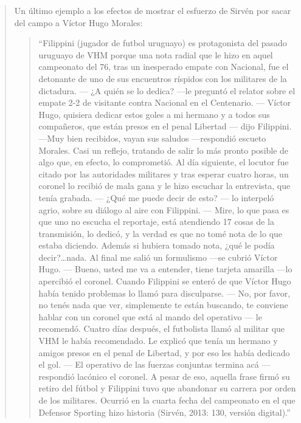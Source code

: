 \begin{quote}
Un último ejemplo a los efectos de mostrar el esfuerzo de Sirvén por sacar del campo a Víctor Hugo Morales:

\begin{quote}
	\enquote{Filippini (jugador de futbol uruguayo) es protagonista del pasado uruguayo de VHM porque una nota radial que le hizo en aquel campeonato del 76, tras un inesperado empate con Nacional, fue el detonante de uno de sus encuentros ríspidos con los militares de la dictadura. --- ¿A quién se lo dedica? ---le preguntó el relator sobre el empate 2-2 de visitante contra Nacional en el Centenario. --- Víctor Hugo, quisiera dedicar estos goles a mi hermano y a todos sus compañeros, que están presos en el penal Libertad --- dijo Filippini. ---Muy bien recibidos, vayan sus saludos ---respondió escueto Morales. Casi un reflejo, tratando de salir lo más pronto posible de algo que, en efecto, lo comprometió. Al día siguiente, el locutor fue citado por las autoridades militares y tras esperar cuatro horas, un coronel lo recibió de mala gana y le hizo escuchar la entrevista, que tenía grabada. --- ¿Qué me puede decir de esto? --- lo interpeló agrio, sobre su diálogo al aire con Filippini. --- Mire, lo que pasa es que uno no escucha el reportaje, está atendiendo 17 cosas de la transmisión, lo dedicó, y la verdad es que no tomé nota de lo que estaba diciendo. Además si hubiera tomado nota, ¿qué le podía decir?\dots nada. Al final me salió un formulismo ---se cubrió Víctor Hugo. --- Bueno, usted me va a entender, tiene tarjeta amarilla ---lo apercibió el coronel. Cuando Filippini se enteró de que Víctor Hugo había tenido problemas lo llamó para disculparse. --- No, por favor, no tenés nada que ver, simplemente te están buscando, te conviene hablar con un coronel que está al mando del operativo --- le recomendó. Cuatro días después, el futbolista llamó al militar que VHM le había recomendado. Le explicó que tenía un hermano y amigos presos en el penal de Libertad, y por eso les había dedicado el gol. --- El operativo de las fuerzas conjuntas termina acá ---respondió lacónico el coronel. A pesar de eso, aquella frase firmó su retiro del fútbol y Filippini tuvo que abandonar su carrera por orden de los militares. Ocurrió en la cuarta fecha del campeonato en el que Defensor Sporting hizo historia (Sirvén, 2013: 130, versión digital).}
\end{quote}



\end{quote}
